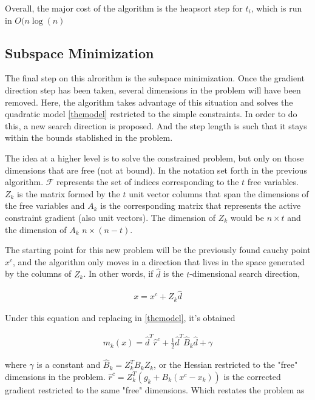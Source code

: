 Overall, the major cost of the algorithm is the heapsort step for $t_i$, which is run in $O(n \log(n)$


\subsection{Subspace Minimization}

The final step on this alrorithm is the subspace minimization.  Once the gradient direction step has been taken, several dimensions in the problem will have been removed.  Here, the algorithm takes advantage of this situation and solves the quadratic model \ref{themodel} restricted to the simple constraints.  In order to do this, a new search direction is proposed.  And the step length is such that it stays within the bounds stablished in the problem.

The idea at a higher level is to solve the constrained problem, but only on those dimensions that are free (not at bound).  In the notation set forth in the previous algorithm.  $\mathcal{F}$ represents the set of indices corresponding to the $t$ free variables.  $Z_k$ is the matrix formed by the $t$ unit vector columns that span the dimensions of the free variables and $A_k$ is the corresponding matrix that represents the active constraint gradient (also unit vectors).  The dimension of $Z_k$ would be $n \times t$ and the dimension of $A_k$ $n \times (n - t)$.

The starting point for this new problem will be the previously found cauchy point $x^c$, and the algorithm only moves in a direction that lives in the space generated by the columns of $Z_k$.  In other words, if $\hat{d}$ is the $t$-dimensional search direction,  

\begin{equation} \label{dirconst}
  \begin{aligned}
    x = x^c + Z_k \hat{d}
  \end{aligned}
\end{equation}

Under this equation and replacing in \ref{themodel}, it's obtained

\begin{equation} \label{themodelrestr}
  \begin{aligned}
    m_k(x) = \hat{d}^T\hat{r}^c + \frac{1}{2} \hat{d}^T \hat{B}_k \hat{d} + \gamma
  \end{aligned}
\end{equation}

where $\gamma$ is a constant and $\hat{B}_k = Z_k^T B_k Z_k$, or the Hessian restricted to the "free" dimensions in the problem.  $\hat{r}^c = Z^T_k (g_k + B_k(x^c - x_k))$ is the corrected gradient restricted to the same "free" dimensions.  Which restates the problem as

